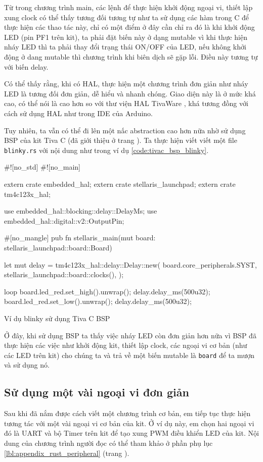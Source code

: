 Từ trong chương trình main, các lệnh để thực hiện khởi động ngoại vi, thiết lập xung clock có thể thấy tương đối tương tự như ta sử dụng các hàm trong C để thực hiện các thao tác này, chỉ có một điểm ở đây cần chỉ ra đó là khi khởi động LED (pin PF1 trên kit), ta phải đặt biến này ở dạng mutable vì khi thực hiện nháy LED thì ta phải thay đổi trạng thái ON/OFF của LED, nếu không khởi động ở dang mutable thì chương trình khi biên dịch sẽ gặp lỗi. Điều này tương tự với biến delay.

Có thể thấy rằng, khi có HAL, thực hiện một chương trình đơn giản như nháy LED là tương đối đơn giản, dễ hiểu và nhanh chóng.
Giao diện này là ở mức khá cao, có thể nói là cao hơn so với thư viện HAL TivaWare \cite{tivac_tivaware}, khá tương đồng với cách sử dụng HAL như trong IDE của Arduino.

Tuy nhiên, ta vẫn có thể đi lên một nấc abstraction cao hơn nữa nhờ sử dụng BSP của kit Tiva C (đã giới thiệu ở trang \pageref{lbl:tivac_bsp}).
Ta thực hiện viết viết một file \texttt{blinky.rs} với nội dung như trong ví dụ \ref{code:tivac_bsp_blinky}.

\begin{listing}[ht]
\begin{rustcode}
#![no_std]
#![no_main]

extern crate embedded_hal;
extern crate stellaris_launchpad;
extern crate tm4c123x_hal;

use embedded_hal::blocking::delay::DelayMs;
use embedded_hal::digital::v2::OutputPin;

#[no_mangle]
pub fn stellaris_main(mut board: stellaris_launchpad::board::Board) {
    let mut delay = tm4c123x_hal::delay::Delay::new(
        board.core_peripherals.SYST,
        stellaris_launchpad::board::clocks(),
    );

    loop {
        board.led_red.set_high().unwrap();
        delay.delay_ms(500u32);
        board.led_red.set_low().unwrap();
        delay.delay_ms(500u32);
    }
}
\end{rustcode}
\caption{Ví dụ blinky sử dụng Tiva C BSP}
\label{code:tivac_bsp_blinky}
\end{listing}

Ở đây, khi sử dụng BSP ta thấy việc nháy LED còn đơn giản hơn nữa vì BSP đã thực hiện các việc như khởi động kit, thiết lập clock, các ngoại vi cơ bản (như các LED trên kit) cho chúng ta và trả về một biến mutable là \texttt{board} để ta mượn và sử dụng nó.

\subsection{Sử dụng một vài ngoại vi đơn giản}\label{lbl:rust_peripheral}
Sau khi đã nắm được cách viết một chương trình cơ bản, em tiếp tục thực hiện tương tác với một vài ngoại vi cơ bản của kit.
Ở ví dụ này, em chọn hai ngoại vi đó là UART và bộ Timer trên kit để tạo xung PWM điều khiển LED của kit.
Nội dung của chương trình người đọc có thể tham khảo ở phần phụ lục \ref{lbl:appendix_rust_peripheral} (trang \pageref{lbl:appendix_rust_peripheral}).

